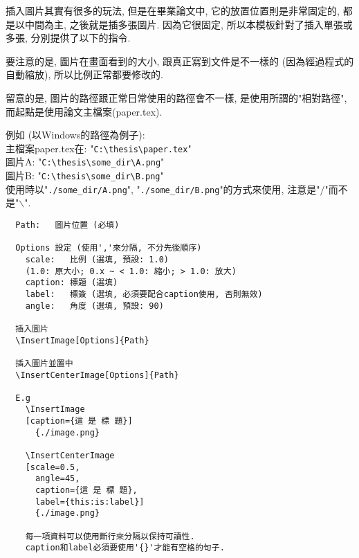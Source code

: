 
插入圖片其實有很多的玩法, 但是在畢業論文中, 它的放置位置則是非常固定的, 都是以中間為主, 之後就是插多張圖片. 因為它很固定, 所以本模板針對了插入單張或多張, 分別提供了以下的指令.

要注意的是, 圖片在畫面看到的大小, 跟真正寫到文件是不一樣的 (因為經過程式的自動縮放), 所以比例正常都要修改的.

留意的是, 圖片的路徑跟正常日常使用的路徑會不一樣, 是使用所謂的"相對路徑", 而起點是使用論文主檔案(paper.tex).

\noindent 例如 (以Windows的路徑為例子):\\
主檔案paper.tex在: "\verb|C:\thesis\paper.tex|"\\
圖片A: "\verb|C:\thesis\some_dir\A.png|"\\
圖片B: "\verb|C:\thesis\some_dir\B.png|"\\
使用時以"\verb|./some_dir/A.png|", "\verb|./some_dir/B.png|"的方式來使用, 注意是"$/$"而不是"$\backslash$".


\newpage
{}

  \begin{framed}
  \begin{verbatim}
  Path:   圖片位置 (必填)

  Options 設定 (使用','來分隔, 不分先後順序)
    scale:   比例 (選填, 預設: 1.0)
    (1.0: 原大小; 0.x ~ < 1.0: 縮小; > 1.0: 放大)
    caption: 標題 (選填)
    label:   標簽 (選填, 必須要配合caption使用, 否則無效)
    angle:   角度 (選填, 預設: 90)

  插入圖片
  \InsertImage[Options]{Path}

  插入圖片並置中
  \InsertCenterImage[Options]{Path}

  E.g
    \InsertImage
    [caption={這 是 標 題}]
      {./image.png}

    \InsertCenterImage
    [scale=0.5,
      angle=45,
      caption={這 是 標 題},
      label={this:is:label}]
      {./image.png}

    每一項資料可以使用斷行來分隔以保持可讀性.
    caption和label必須要使用'{}'才能有空格的句子.
  \end{verbatim}
  \end{framed}

